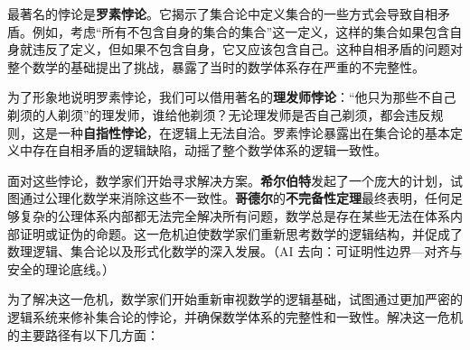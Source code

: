 最著名的悖论是{\bf 罗素悖论}。它揭示了集合论中定义集合的一些方式会导致自相矛盾。例如，考虑“所有不包含自身的集合的集合”这一定义，这样的集合如果包含自身就违反了定义，但如果不包含自身，它又应该包含自己。这种自相矛盾的问题对整个数学的基础提出了挑战，暴露了当时的数学体系存在严重的不完整性。

为了形象地说明罗素悖论，我们可以借用著名的{\bf 理发师悖论}：“他只为那些不自己剃须的人剃须”的理发师，谁给他剃须？无论理发师是否自己剃须，都会违反规则，这是一种{\bf 自指性悖论}，在逻辑上无法自洽。罗素悖论暴露出在集合论的基本定义中存在自相矛盾的逻辑缺陷，动摇了整个数学体系的逻辑一致性。

面对这些悖论，数学家们开始寻求解决方案。{\bf 希尔伯特}发起了一个庞大的计划，试图通过公理化数学来消除这些不一致性。{\bf 哥德尔}的{\bf 不完备性定理}最终表明，任何足够复杂的公理体系内部都无法完全解决所有问题，数学总是存在某些无法在体系内部证明或证伪的命题。这一危机迫使数学家们重新思考数学的逻辑结构，并促成了数理逻辑、集合论以及形式化数学的深入发展。{（AI 去向：可证明性边界—对齐与安全的理论底线。）}

为了解决这一危机，数学家们开始重新审视数学的逻辑基础，试图通过更加严密的逻辑系统来修补集合论的悖论，并确保数学体系的完整性和一致性。解决这一危机的主要路径有以下几方面：

